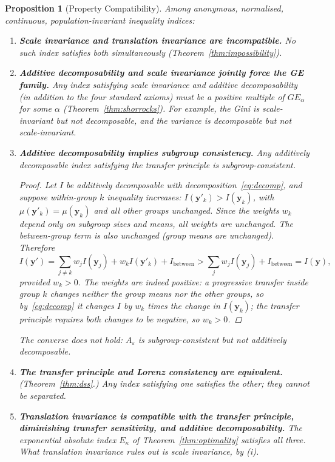 \documentclass[12pt]{article}
\theoremstyle{plain}
\newtheorem{proposition}[theorem]{Proposition}
\theoremstyle{definition}
\theoremstyle{remark}
\newcommand{\bfy}{\mathbf{y}}
\begin{document}
\begin{proposition}[Property Compatibility]\label{prop:compatibility}
Among anonymous, normalised, continuous, population-invariant inequality indices:
\begin{enumerate}[label=(\roman*)]
    \item \textbf{Scale invariance and translation invariance are incompatible.}
    No such index satisfies both simultaneously (Theorem~\ref{thm:impossibility}).

    \item \textbf{Additive decomposability and scale invariance jointly force the GE family.}
    Any index satisfying scale invariance and additive decomposability (in addition to the four standard axioms) must be a positive multiple of $GE_\alpha$ for some $\alpha$ (Theorem~\ref{thm:shorrocks}).
    For example, the Gini is scale-invariant but not decomposable, and the variance is decomposable but not scale-invariant.

    \item \textbf{Additive decomposability implies subgroup consistency.}
    Any additively decomposable index satisfying the transfer principle is subgroup-consistent.
    \begin{proof}
    Let $I$ be additively decomposable with decomposition~\eqref{eq:decomp}, and suppose within-group $k$ inequality increases: $I(\bfy'_k) > I(\bfy_k)$, with $\mu(\bfy'_k) = \mu(\bfy_k)$ and all other groups unchanged.
    Since the weights $w_k$ depend only on subgroup sizes and means, all weights are unchanged.
    The between-group term is also unchanged (group means are unchanged).
    Therefore
    \[
        I(\bfy') = \sum_{j \neq k} w_j I(\bfy_j) + w_k I(\bfy'_k) + I_{\text{between}} > \sum_{j} w_j I(\bfy_j) + I_{\text{between}} = I(\bfy),
    \]
    provided $w_k > 0$.
    The weights are indeed positive: a progressive transfer inside group $k$ changes neither the group means nor the other groups, so by~\eqref{eq:decomp} it changes $I$ by $w_k$ times the change in $I(\bfy_k)$; the transfer principle requires both changes to be negative, so $w_k > 0$.
    \end{proof}
    The converse does not hold: $A_\varepsilon$ is subgroup-consistent but not additively decomposable.

    \item \textbf{The transfer principle and Lorenz consistency are equivalent.}
    (Theorem~\ref{thm:dss}.)
    Any index satisfying one satisfies the other; they cannot be separated.

    \item \textbf{Translation invariance is compatible with the transfer principle, diminishing transfer sensitivity, and additive decomposability.}
    The exponential absolute index $E_\kappa$ of Theorem~\ref{thm:optimality} satisfies all three.
    What translation invariance rules out is scale invariance, by (i).
\end{enumerate}
\end{proposition}
\end{document}
